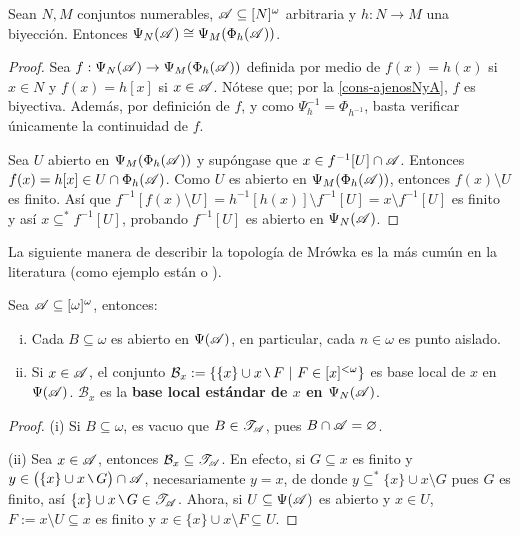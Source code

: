 	\begin{proposicion}\label{prop-MrowHomeoBiyec}
		Sean $N,M$ conjuntos numerables, $\mathscr{A} \subseteq [N]^\omega$ arbitraria y $h:N \to M$ una biyección. Entonces $\Psi_N(\mathscr{A}) \cong \Psi_M(\Phi_h(\mathscr{A}))$.
	\end{proposicion}
	\begin{proof} 
		Sea $f:\Psi_N(\mathscr{A}) \to \Psi_M(\Phi_h(\mathscr{A}))$ definida por medio de $f(x)=h(x)$ si $x \in N$ y $f(x)=h[x]$ si $x \in \mathscr{A}$. Nótese que; por la \autoref{cons-ajenosNyA}, $f$ es biyectiva. Además, por definición de $f$, y como $\Psi_h^{-1}=\Phi_{h^{-1}}$, basta verificar únicamente la continuidad de $f$.
	
		Sea $U$ abierto en $\Psi_M(\Phi_h(\mathscr{A}))$ y supóngase que $x \in f^{-1}[U] \cap \mathscr{A}$. Entonces $f(x) = h[x] \in U \cap \Phi_h(\mathscr{A})$. Como $U$ es abierto en $\Psi_M(\Phi_h(\mathscr{A}))$, entonces $f(x) \setminus U$ es finito. Así que $f^{-1}[f(x) \setminus U] = h^{-1}[h(x)] \setminus f^{-1}[U] = x \setminus f^{-1}[U]$ es finito y así $x \subseteq^* f^{-1}[U]$, probando $f^{-1}[U]$ es abierto en $\Psi_N(\mathscr{A})$.
	\end{proof} 


	\newpage
	
	La siguiente manera de describir la topología de Mrówka es la más cumún en la literatura (como ejemplo están \cite{hruMrowka} o \cite{hruAlmost}).

	\begin{proposicion}\label{prop-BaseLocMrowka}
		Sea $\mathscr{A} \subseteq [\omega]^\omega$, entonces:
		\begin{enumerate}[i)]
			\item Cada $B \subseteq \omega$ es abierto en $\Psi(\mathscr{A})$, en particular, cada $n \in \omega$ es punto aislado.
			\item Si $x \in \mathscr{A}$, el conjunto $\mathcal{B}_x:=\{ \{x\} \cup x \setminus F \tq F \in[x]^{<\omega} \}$ es base local de $x$ en $\Psi(\mathscr{A})$. $\mathcal{B}_x$ es la \textbf{base local estándar de $x$ en $\Psi_N(\mathscr{A})$}.
		\end{enumerate}
	\end{proposicion}
	\begin{proof} 
		(i) Si $B \subseteq \omega$, es vacuo que $B \in \mathscr{T}_{\mathscr{A}}$, pues $B \cap \mathscr{A} = \varnothing$.
	
		(ii) Sea $x \in \mathscr{A}$, entonces $\mathcal{B}_x \subseteq \mathscr{T}_{\mathscr{A}}$. En efecto, si $G \subseteq x$ es finito y $y \in \big( \{x\} \cup x \setminus G \big) \cap \ms{A}$, necesariamente $y=x$, de donde $y \subseteq^* \{x\} \cup x \setminus G$ pues $G$ es finito, así $\{x\} \cup x \setminus G \in \tau_{\ms{A}}$. Ahora, si $U \subseteq \Psi(\mathscr{A)}$ es abierto y $x \in U$, $F:= x \setminus U \subseteq x$ es finito y $x \in \{x\} \cup x \setminus F \subseteq U$.
	\end{proof} 
		
